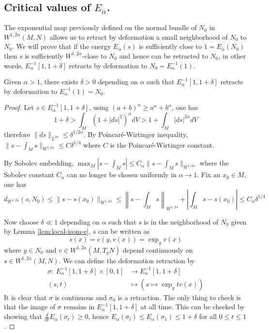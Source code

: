 \subsection{Critical values of \(E_\alpha\).}
\label{sec:org7be5a37}

The exponential map previously defined on the normal bundle of \(N_0\) in  \(W^{1,
2\alpha}(M,N)\) allows us to retract by deformation a small neighborhood of \(N_0\) to
\(N_0\). We will prove that if the energy \(E_\alpha(s)\) is sufficiently close to \(1=E_\alpha(N_0)\) then \(s\) is sufficiently \(W^{1,2\alpha}\)-close to \(N_0\) and hence can be retracted to \(N_0\), in other words, \(E_\alpha^{-1}[1, 1+\delta]\) retracts by deformation to \(N_0 = E_\alpha^{-1}(1)\).

\begin{proposition}[]
\label{prop:crit-val-1}
Given \(\alpha>1\), there exists \(\delta >0\) depending on \(\alpha\) such that \(E_\alpha^{-1}[1, 1+\delta]\) retracts by deformation to \(E_\alpha^{-1}(1) = N_0\).
\end{proposition}

\begin{proof}
Let \(s\in E_\alpha^{-1}[1, 1+\delta]\), using \((a+b)^\alpha \geq a^\alpha + b^\alpha\), one has
\[
 1 + \delta > \int_M (1+|ds|^2)^\alpha dV > 1 + \int_M |ds|^{2\alpha}dV
\]
therefore \(\|ds\|_{L^{2\alpha}}\leq \delta ^{1/{2\alpha}}\). By Poincaré-Wirtinger
inequality, \(\|s-\int_M s\|_{W^{1,2\alpha}}\leq C \delta^{1/4}\) where \(C\) is the
Poincaré-Wirtinger constant.

By Sobolev embedding, \(\max_M |s-\int_M s| \leq C_\alpha \|s -\int_M s\|_{W^{1,2\alpha}}\)
where the Sobolev constant \(C_\alpha\) can no longer be chosen uniformly in \(\alpha
\to 1\). Fix an \(x_0\in M\), one has
\[
 d_{W^{1,2\alpha}}(s, N_0) \leq \|s - s(x_0)\|_{W^{1,2\alpha}} \leq \left\|s-\int_M
s\right\|_{W^{1,2\alpha}} + \left|\int_M s - s(x_0)\right| \leq C_\alpha \delta^{1/4}
\]

Now choose \(\delta \ll 1\) depending on \(\alpha\) such that \(s\) is in the
neighborhood of \(N_0\) given by Lemma \ref{lem:local-isom-e}, \(s\) can be written as
\[
 s(x) = e(y,v(x)) = \exp_y v(x)
\]
where \(y\in N_0\) and \(v\in W^{1,2\alpha}(M, T_yN)\) depend continuously on \(s\in
W^{1,2\alpha}(M,N)\). We can define the deformation retraction by
\begin{align*}
  \sigma:\ E^{-1}_\alpha [1,1+\delta]\times [0,1] & \longrightarrow E^{-1}_\alpha[1,1+\delta]\\
  	   		 (s,t)		    	  &\longmapsto \left( x\mapsto \exp_y tv(x)\right)
\end{align*}
It is clear that \(\sigma\) is continuous and \(\sigma_0\) is a retraction. The only
thing to check is that the image of \(\sigma\) remains in \(E_\alpha^{-1}[1,1+\delta]\) at all time. This can be checked by showing that \(\frac{d}{dt}E_\alpha(\sigma_t) \geq
0\), hence \(E_\alpha(\sigma_t) \leq E_\alpha(\sigma_1) \leq 1+\delta\) for all \(0\leq
t\leq 1\).
\end{proof}

